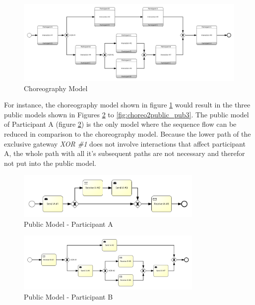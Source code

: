 \begin{figure}[H]
\includegraphics[width=1\textwidth]{src/images/choreo2public_choreo.png}
\caption{Choreography Model}
\label{fig:choreo2public}
\end{figure}

For instance, the choreography model shown in figure \ref{fig:choreo2public} would result in the three public models shown in Figures \ref{fig:choreo2public_pub} to \ref{fig:choreo2public_pub3}. The public model of Participant A (figure \ref{fig:choreo2public_pub}) is the only model where the sequence flow can be reduced in comparison to the choreography model. Because the lower path of the exclusive gateway \textit{XOR \#1} does not involve interactions that affect participant A, the whole path with all it's subsequent paths are not necessary and therefor not put into the public model.\\

\begin{figure}[H]
\centering
\includegraphics[width=0.8\textwidth]{src/images/choreo2public_pub1.png}
\caption{Public Model - Participant A}
\label{fig:choreo2public_pub}
\end{figure}

\begin{figure}[H]
\centering
\includegraphics[width=0.8\textwidth]{src/images/choreo2public_pub2.png}
\caption{Public Model - Participant B}
\label{fig:choreo2public_pub2}
\end{figure}

